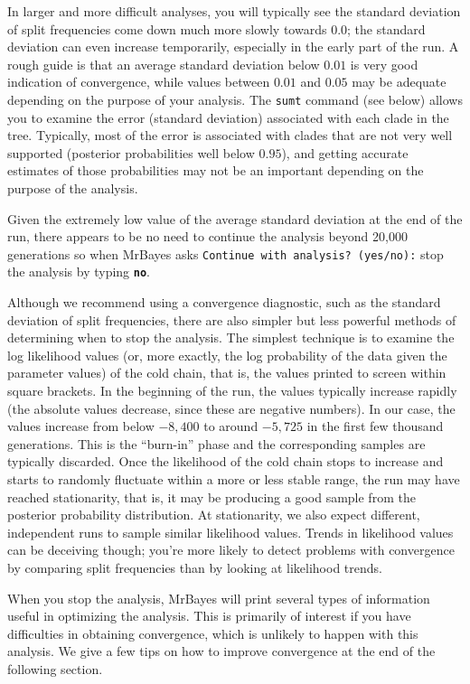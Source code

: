 \documentclass[12pt]{book}
\newcommand{\ttt}[1]{\texttt{#1}}
\newcommand{\tb}[1]{\ttt{\textbf{#1}}}
\begin{document}
In larger and more difficult analyses, you will typically see the standard deviation of split
frequencies come down much more slowly towards 0.0; the standard deviation can even increase
temporarily, especially in the early part of the run. A rough guide is that an average standard
deviation below $0.01$ is very good indication of convergence, while values between $0.01$ and
$0.05$ may be adequate depending on the purpose of your analysis. The \texttt{sumt} command (see
below) allows you to examine the error (standard deviation) associated with each clade in the tree.
Typically, most of the error is associated with clades that are not very well supported (posterior
probabilities well below $0.95$), and getting accurate estimates of those probabilities may not be
an important depending on the purpose of the analysis.

Given the extremely low value of the average standard deviation at the end of the run, there
appears to be no need to continue the analysis beyond 20,000 generations so when MrBayes asks
\texttt{Continue with analysis? (yes/no):} stop the analysis by typing \tb{no}.

Although we recommend using a convergence diagnostic, such as the standard deviation of split
frequencies, there are also simpler but less powerful methods of determining when to stop the
analysis. The simplest technique is to examine the log likelihood values (or, more exactly, the log
probability of the data given the parameter values) of the cold chain, that is, the values printed
to screen within square brackets. In the beginning of the run, the values typically increase
rapidly (the absolute values decrease, since these are negative numbers). In our case, the values
increase from below $-8,400$ to around $-5,725$ in the first few thousand generations. This is the
``burn-in'' phase and the corresponding samples are typically discarded. Once the likelihood of
the cold chain stops to increase and starts to randomly fluctuate within a more or less stable
range, the run may have reached stationarity, that is, it may be producing a good sample from the
posterior probability distribution. At stationarity, we also expect different, independent runs to
sample similar likelihood values. Trends in likelihood values can be deceiving though; you're more
likely to detect problems with convergence by comparing split frequencies than by looking at
likelihood trends.

When you stop the analysis, MrBayes will print several types of information useful in optimizing
the analysis. This is primarily of interest if you have difficulties in obtaining convergence,
which is unlikely to happen with this analysis. We give a few tips on how to improve convergence at
the end of the following section.
\end{document}
